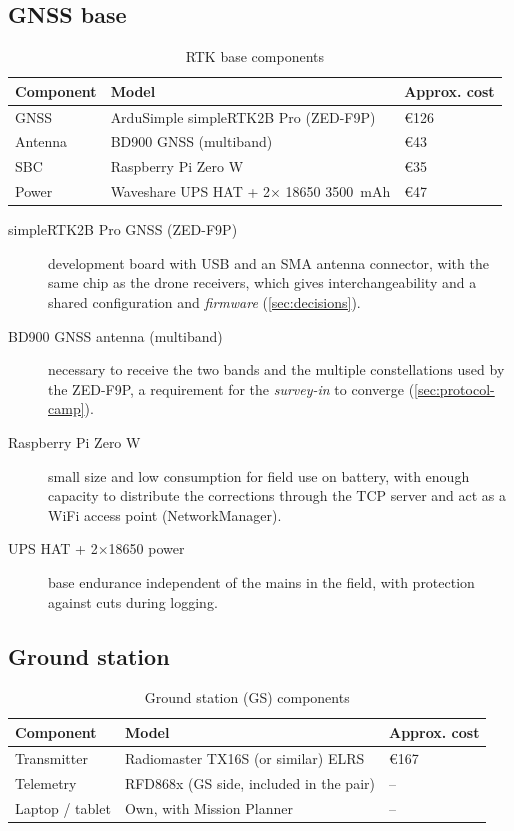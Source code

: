 \subsection{GNSS base}

\begin{table}[H]
    \centering
    \caption{RTK base components}
    \label{tab:materials-base}
    \begin{tabular}{lll}
        \toprule
        Component & Model & Approx. cost \\
        \midrule
        GNSS & ArduSimple simpleRTK2B Pro (ZED-F9P) & €126 \\
        Antenna & BD900 GNSS (multiband) & €43 \\
        SBC & Raspberry Pi Zero W & €35 \\
        Power & Waveshare UPS HAT + 2$\times$ 18650 3500~mAh & €47 \\
        \bottomrule
    \end{tabular}
\end{table}

\begin{description}
    \item[simpleRTK2B Pro GNSS (ZED-F9P)] development board with USB and an SMA antenna connector, with the same chip as the drone receivers, which gives interchangeability and a shared configuration and \emph{firmware} (\cref{sec:decisions}).
    \item[BD900 GNSS antenna (multiband)] necessary to receive the two bands and the multiple constellations used by the ZED-F9P, a requirement for the \emph{survey-in} to converge (\cref{sec:protocol-camp}).
    \item[Raspberry Pi Zero W] small size and low consumption for field use on battery, with enough capacity to distribute the corrections through the TCP server and act as a WiFi access point (NetworkManager).
    \item[UPS HAT + 2$\times$18650 power] base endurance independent of the mains in the field, with protection against cuts during logging.
\end{description}

\subsection{Ground station}

\begin{table}[H]
    \centering
    \caption{Ground station (GS) components}
    \label{tab:materials-gs}
    \begin{tabular}{lll}
        \toprule
        Component & Model & Approx. cost \\
        \midrule
        Transmitter & Radiomaster TX16S (or similar) ELRS & €167 \\
        Telemetry & RFD868x (GS side, included in the pair) & -- \\
        Laptop / tablet & Own, with Mission Planner & -- \\
        \bottomrule
    \end{tabular}
\end{table}

